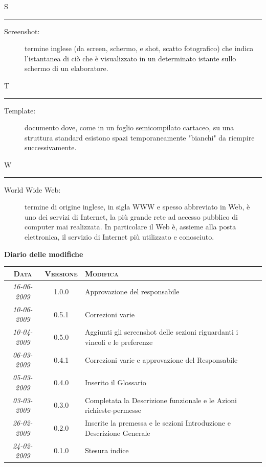 \documentclass[11pt,a4paper]{article}
\newcommand{\modifiche} 
{
\newpage
\begin{center}
\textbf{Diario delle modifiche} \\
\bigskip
\begin{tabular}{|c|c|p{0.62\textwidth}|}
\hline
\textsc{Data} & \textsc{Versione} & \textsc{Modifica} \\
\hline
\hline
\textit{16-06-2009} & 1.0.0 & Approvazione del responsabile\\
\hline
\textit{10-06-2009} & 0.5.1 & Correzioni varie\\
\hline
\textit{10-04-2009} & 0.5.0 & Aggiunti gli screenshot delle sezioni riguardanti i vincoli e le preferenze\\
\hline
\textit{06-03-2009} & 0.4.1 & Correzioni varie e approvazione del Responsabile\\
\hline
\textit{05-03-2009} & 0.4.0 & Inserito il Glossario\\
\hline
\textit{03-03-2009} & 0.3.0 & Completata la Descrizione funzionale e le Azioni richieste-permesse\\
\hline
\textit{26-02-2009} & 0.2.0 & Inserite la premessa e le sezioni Introduzione e Descrizione Generale\\
\hline
\textit{24-02-2009} & 0.1.0 & Stesura indice\\
\hline
\end{tabular}
\end{center}
}
\begin{document}
\bigskip
\Huge S \bigskip
\hrule
\smallskip
\normalsize
\begin{description}
	\item[Screenshot:] termine inglese (da screen, schermo, e shot, scatto fotografico) che indica l'istantanea di ciò che è visualizzato in un determinato istante sullo schermo di un elaboratore.
\end{description}
\bigskip
\Huge T \bigskip
\hrule
\smallskip
\normalsize
\begin{description}
	\item[Template:] documento dove, come in un foglio semicompilato cartaceo, su una struttura standard esistono spazi temporaneamente "bianchi" da riempire successivamente.
\end{description}
\bigskip
\Huge W \bigskip
\hrule
\smallskip
\normalsize
\begin{description}
	\item[World Wide Web:] termine di origine inglese, in sigla WWW e spesso abbreviato in Web, è uno dei servizi di Internet, la più grande rete ad accesso pubblico di computer mai realizzata. In particolare il Web è, assieme alla posta elettronica, il servizio di Internet più utilizzato e conosciuto.
\end{description}
\modifiche
\end{document}
